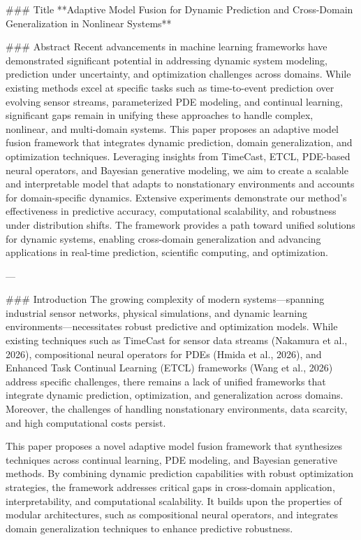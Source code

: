 ### Title
**Adaptive Model Fusion for Dynamic Prediction and Cross-Domain Generalization in Nonlinear Systems**

### Abstract
Recent advancements in machine learning frameworks have demonstrated significant potential in addressing dynamic system modeling, prediction under uncertainty, and optimization challenges across domains. While existing methods excel at specific tasks such as time-to-event prediction over evolving sensor streams, parameterized PDE modeling, and continual learning, significant gaps remain in unifying these approaches to handle complex, nonlinear, and multi-domain systems. This paper proposes an adaptive model fusion framework that integrates dynamic prediction, domain generalization, and optimization techniques. Leveraging insights from TimeCast, ETCL, PDE-based neural operators, and Bayesian generative modeling, we aim to create a scalable and interpretable model that adapts to nonstationary environments and accounts for domain-specific dynamics. Extensive experiments demonstrate our method's effectiveness in predictive accuracy, computational scalability, and robustness under distribution shifts. The framework provides a path toward unified solutions for dynamic systems, enabling cross-domain generalization and advancing applications in real-time prediction, scientific computing, and optimization.

---

### Introduction
The growing complexity of modern systems—spanning industrial sensor networks, physical simulations, and dynamic learning environments—necessitates robust predictive and optimization models. While existing techniques such as TimeCast for sensor data streams (Nakamura et al., 2026), compositional neural operators for PDEs (Hmida et al., 2026), and Enhanced Task Continual Learning (ETCL) frameworks (Wang et al., 2026) address specific challenges, there remains a lack of unified frameworks that integrate dynamic prediction, optimization, and generalization across domains. Moreover, the challenges of handling nonstationary environments, data scarcity, and high computational costs persist.

This paper proposes a novel adaptive model fusion framework that synthesizes techniques across continual learning, PDE modeling, and Bayesian generative methods. By combining dynamic prediction capabilities with robust optimization strategies, the framework addresses critical gaps in cross-domain application, interpretability, and computational scalability. It builds upon the properties of modular architectures, such as compositional neural operators, and integrates domain generalization techniques to enhance predictive robustness.

